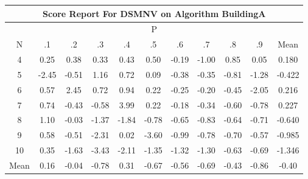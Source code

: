 \documentclass[11pt,a4paper]{report}
\begin{document}
\begin{longtable}{ | c || c | c | c | c | c | c | c | c | c || c |}
\hline
\multicolumn{11}{|c|}{ Score Report For DSMNV on Algorithm BuildingA} \\
\hline
\multicolumn{11}{|c|}{ P } \\
\hline
N & .1 & .2 & .3 & .4 & .5 & .6 & .7 & .8 & .9 & Mean\\
 \hline
 \hline
 \endhead
  4 &  \cellcolor[HTML]{F7F7FF} 0.25 &  \cellcolor[HTML]{F7F7FF} 0.38 &  \cellcolor[HTML]{F7F7FF} 0.33 &  \cellcolor[HTML]{F7F7FF} 0.43 &  \cellcolor[HTML]{EFEFFF} 0.50 &  \cellcolor[HTML]{FFF7F7} -0.19 &  \cellcolor[HTML]{FFE7E7} -1.00 &  \cellcolor[HTML]{E7E7FF} 0.85 &  \cellcolor[HTML]{FFFFFF} 0.05 & 0.180 \\
  5 &  \cellcolor[HTML]{FFBFBF} -2.45 &  \cellcolor[HTML]{FFEFEF} -0.51 &  \cellcolor[HTML]{DFDFFF} 1.16 &  \cellcolor[HTML]{EFEFFF} 0.72 &  \cellcolor[HTML]{FFFFFF} 0.09 &  \cellcolor[HTML]{FFF7F7} -0.38 &  \cellcolor[HTML]{FFF7F7} -0.35 &  \cellcolor[HTML]{FFE7E7} -0.81 &  \cellcolor[HTML]{FFDFDF} -1.28 & -0.422 \\
  6 &  \cellcolor[HTML]{EFEFFF} 0.57 &  \cellcolor[HTML]{BFBFFF} 2.45 &  \cellcolor[HTML]{EFEFFF} 0.72 &  \cellcolor[HTML]{E7E7FF} 0.94 &  \cellcolor[HTML]{F7F7FF} 0.22 &  \cellcolor[HTML]{FFF7F7} -0.25 &  \cellcolor[HTML]{FFF7F7} -0.20 &  \cellcolor[HTML]{FFF7F7} -0.45 &  \cellcolor[HTML]{FFCFCF} -2.05 & 0.216 \\
  7 &  \cellcolor[HTML]{EFEFFF} 0.74 &  \cellcolor[HTML]{FFF7F7} -0.43 &  \cellcolor[HTML]{FFEFEF} -0.58 &  \cellcolor[HTML]{9797FF} 3.99 &  \cellcolor[HTML]{F7F7FF} 0.22 &  \cellcolor[HTML]{FFF7F7} -0.18 &  \cellcolor[HTML]{FFF7F7} -0.34 &  \cellcolor[HTML]{FFEFEF} -0.60 &  \cellcolor[HTML]{FFEFEF} -0.78 & 0.227 \\
  8 &  \cellcolor[HTML]{E7E7FF} 1.10 &  \cellcolor[HTML]{FFFFFF} -0.03 &  \cellcolor[HTML]{FFDFDF} -1.37 &  \cellcolor[HTML]{FFCFCF} -1.84 &  \cellcolor[HTML]{FFEFEF} -0.78 &  \cellcolor[HTML]{FFEFEF} -0.65 &  \cellcolor[HTML]{FFE7E7} -0.83 &  \cellcolor[HTML]{FFEFEF} -0.64 &  \cellcolor[HTML]{FFEFEF} -0.71 & -0.640 \\
  9 &  \cellcolor[HTML]{EFEFFF} 0.58 &  \cellcolor[HTML]{FFEFEF} -0.51 &  \cellcolor[HTML]{FFC7C7} -2.31 &  \cellcolor[HTML]{FFFFFF} 0.02 &  \cellcolor[HTML]{FFA7A7} -3.60 &  \cellcolor[HTML]{FFE7E7} -0.99 &  \cellcolor[HTML]{FFEFEF} -0.78 &  \cellcolor[HTML]{FFEFEF} -0.70 &  \cellcolor[HTML]{FFEFEF} -0.57 & -0.985 \\
  10 &  \cellcolor[HTML]{F7F7FF} 0.35 &  \cellcolor[HTML]{FFD7D7} -1.63 &  \cellcolor[HTML]{FFA7A7} -3.43 &  \cellcolor[HTML]{FFC7C7} -2.11 &  \cellcolor[HTML]{FFDFDF} -1.35 &  \cellcolor[HTML]{FFDFDF} -1.32 &  \cellcolor[HTML]{FFDFDF} -1.30 &  \cellcolor[HTML]{FFEFEF} -0.63 &  \cellcolor[HTML]{FFEFEF} -0.69 & -1.346 \\
 \hline
 \hline
Mean &  \cellcolor[HTML]{F7F7FF} 0.16 &  \cellcolor[HTML]{FFFFFF} -0.04 &  \cellcolor[HTML]{FFEFEF} -0.78 &  \cellcolor[HTML]{F7F7FF} 0.31 &  \cellcolor[HTML]{FFEFEF} -0.67 &  \cellcolor[HTML]{FFEFEF} -0.56 &  \cellcolor[HTML]{FFEFEF} -0.69 &  \cellcolor[HTML]{FFF7F7} -0.43 &  \cellcolor[HTML]{FFE7E7} -0.86 &  \cellcolor[HTML]{FFF7F7} -0.40
\end{longtable}
\end{document}

